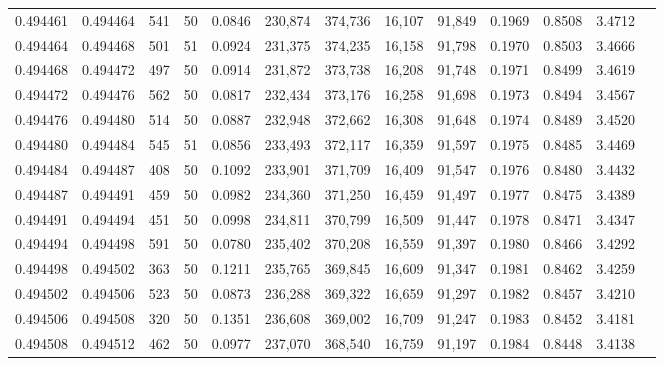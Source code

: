 \begin{tabular}{rrrrrrrrrrrrr}
0.494461 & 0.494464 &   541 &  50 &                                     0.0846 & 230,874 & 374,736 &  16,107 &  91,849 & 0.1969 & 0.8508 & 3.4712 \\
0.494464 & 0.494468 &   501 &  51 &                                     0.0924 & 231,375 & 374,235 &  16,158 &  91,798 & 0.1970 & 0.8503 & 3.4666 \\
0.494468 & 0.494472 &   497 &  50 &                                     0.0914 & 231,872 & 373,738 &  16,208 &  91,748 & 0.1971 & 0.8499 & 3.4619 \\
0.494472 & 0.494476 &   562 &  50 &                                     0.0817 & 232,434 & 373,176 &  16,258 &  91,698 & 0.1973 & 0.8494 & 3.4567 \\
0.494476 & 0.494480 &   514 &  50 &                                     0.0887 & 232,948 & 372,662 &  16,308 &  91,648 & 0.1974 & 0.8489 & 3.4520 \\
0.494480 & 0.494484 &   545 &  51 &                                     0.0856 & 233,493 & 372,117 &  16,359 &  91,597 & 0.1975 & 0.8485 & 3.4469 \\
0.494484 & 0.494487 &   408 &  50 &                                     0.1092 & 233,901 & 371,709 &  16,409 &  91,547 & 0.1976 & 0.8480 & 3.4432 \\
0.494487 & 0.494491 &   459 &  50 &                                     0.0982 & 234,360 & 371,250 &  16,459 &  91,497 & 0.1977 & 0.8475 & 3.4389 \\
0.494491 & 0.494494 &   451 &  50 &                                     0.0998 & 234,811 & 370,799 &  16,509 &  91,447 & 0.1978 & 0.8471 & 3.4347 \\
0.494494 & 0.494498 &   591 &  50 &                                     0.0780 & 235,402 & 370,208 &  16,559 &  91,397 & 0.1980 & 0.8466 & 3.4292 \\
0.494498 & 0.494502 &   363 &  50 &                                     0.1211 & 235,765 & 369,845 &  16,609 &  91,347 & 0.1981 & 0.8462 & 3.4259 \\
0.494502 & 0.494506 &   523 &  50 &                                     0.0873 & 236,288 & 369,322 &  16,659 &  91,297 & 0.1982 & 0.8457 & 3.4210 \\
0.494506 & 0.494508 &   320 &  50 &                                     0.1351 & 236,608 & 369,002 &  16,709 &  91,247 & 0.1983 & 0.8452 & 3.4181 \\
0.494508 & 0.494512 &   462 &  50 &                                     0.0977 & 237,070 & 368,540 &  16,759 &  91,197 & 0.1984 & 0.8448 & 3.4138 \\

\end{tabular}
